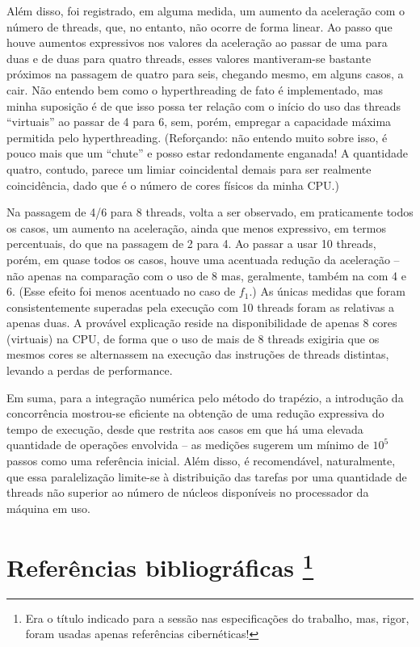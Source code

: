 \documentclass{article}
\begin{document}
  Além disso, foi registrado, em alguma medida, um aumento da aceleração com o número de threads, que, no entanto, não ocorre de forma linear. Ao passo que houve aumentos expressivos nos valores da aceleração ao passar de uma para duas e de duas para quatro threads, esses valores mantiveram-se bastante próximos na passagem de quatro para seis, chegando mesmo, em alguns casos, a cair. Não entendo bem como o hyperthreading de fato é implementado, mas minha suposição é de que isso possa ter relação com o início do uso das threads ``virtuais'' ao passar de 4 para 6, sem, porém, empregar a capacidade máxima permitida pelo hyperthreading. (Reforçando: não entendo muito sobre isso, é pouco mais que um ``chute'' e posso estar redondamente enganada! A quantidade quatro, contudo, parece um limiar coincidental demais para ser realmente coincidência, dado que é o número de cores físicos da minha CPU.)

  Na passagem de 4/6 para 8 threads, volta a ser observado, em praticamente todos os casos, um aumento na aceleração, ainda que menos expressivo, em termos percentuais, do que na passagem de 2 para 4. Ao passar a usar 10 threads, porém, em quase todos os casos, houve uma acentuada redução da aceleração -- não apenas na comparação com o uso de 8 mas, geralmente, também na com 4 e 6. (Esse efeito foi menos acentuado no caso de $f_1$.) As únicas medidas que foram consistentemente superadas pela execução com 10 threads foram as relativas a apenas duas. A provável explicação reside na disponibilidade de apenas 8 cores (virtuais) na CPU, de forma que o uso de mais de 8 threads exigiria que os mesmos cores se alternassem na execução das instruções de threads distintas, levando a perdas de performance.

  Em suma, para a integração numérica pelo método do trapézio, a introdução da concorrência mostrou-se eficiente na obtenção de uma redução expressiva do tempo de execução, desde que restrita aos casos em que há uma elevada quantidade de operações envolvida -- as medições sugerem um mínimo de $10^5$ passos como uma referência inicial. Além disso, é recomendável, naturalmente, que essa paralelização limite-se à distribuição das tarefas por uma quantidade de threads não superior ao número de núcleos disponíveis no processador da máquina em uso.

  \section{Referências bibliográficas \protect\footnote{Era o título indicado para a sessão nas especificações do trabalho, mas,  rigor, foram usadas apenas referências cibernéticas!}} \label{bibl}
\end{document}
